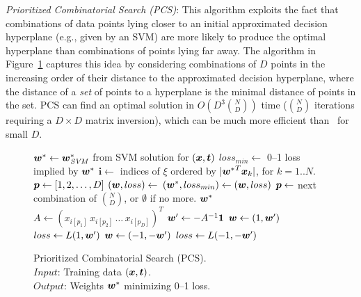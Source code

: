 \noindent\emph{Prioritized Combinatorial Search (PCS)}: This algorithm
exploits the fact that combinations of data points lying closer to an
initial approximated decision hyperplane (e.g., given by an SVM) are
more likely to produce the optimal hyperplane than combinations of
points lying far away.  The algorithm in
Figure~\ref{alg:cs.prioritized} captures this idea by considering
combinations of $D$ points in the increasing order of their distance
to the approximated decision hyperplane, where the distance of a \emph{set}
of points to a hyperplane is the minimal distance of points in the set.  PCS
can find an optimal solution in $O(D^3 \binom{N}{D})$ 
time ($\binom{N}{D}$ iterations requiring a $D \times D$ matrix inversion),
which can be much more efficient than \BB\ for small $D$.

\begin{figure}[tp!]
\vspace{-3mm}
\caption{
Prioritized Combinatorial Search (PCS).\hfill\; \\
\text{\hspace{1.4cm}} $Input$: Training data $(\boldsymbol{x},\boldsymbol{t})$. \\
\text{\hspace{1.4cm}} $Output$: Weights $\boldsymbol{w}^*$ minimizing 0--1 loss.
}
\label{alg:cs.prioritized}
{\footnotesize 
\begin{algorithmic}[1]
 
\State $\boldsymbol{w}^* \gets \boldsymbol{w}^*_{\mathit{SVM}}$ from SVM solution for $(\boldsymbol{x},\boldsymbol{t})$
\State $loss_{min} \gets$ 0--1 loss implied by $\boldsymbol{w}^*$
\State $\boldsymbol{i} \gets$ indices of $\xi$ ordered by $|{\boldsymbol{w}^*}^T\boldsymbol{x}_k|$, for $k=1..N$.
\State $\boldsymbol{p} \gets [1,2,\dots,D]$
\While{$\p \not= \emptyset$}
   \State $(\boldsymbol{w},loss) \gets$ 
      \State $(\boldsymbol{w}^*, loss_{min}) \gets (\boldsymbol{w}, loss)$
   \EndIf
   \State $\boldsymbol{p} \gets $ next combination of ${N \choose D}$, or $\emptyset$ if no more.
\EndWhile
\State \Return $\boldsymbol{w}^*$
\Statex
{} 
   \State $A \gets (x_{i[p_1]} \, x_{i[p_2]} \, \dots \, x_{i[p_D]})^T$
   \State $\boldsymbol{w}' \gets -A^{-1} \boldsymbol{1}$
      \State $\boldsymbol{w} \gets (1, \boldsymbol{w}')$
      \State $loss \gets L(1,\boldsymbol{w}')$
   \Else
      \State $\boldsymbol{w} \gets (-1, -\boldsymbol{w}')$
      \State $loss \gets L(-1,-\boldsymbol{w}')$
   \EndIf
   \State {} 
\EndFunction
\Statex
\EndFunction
\end{algorithmic}}
\vspace{-4mm}
\end{figure}

